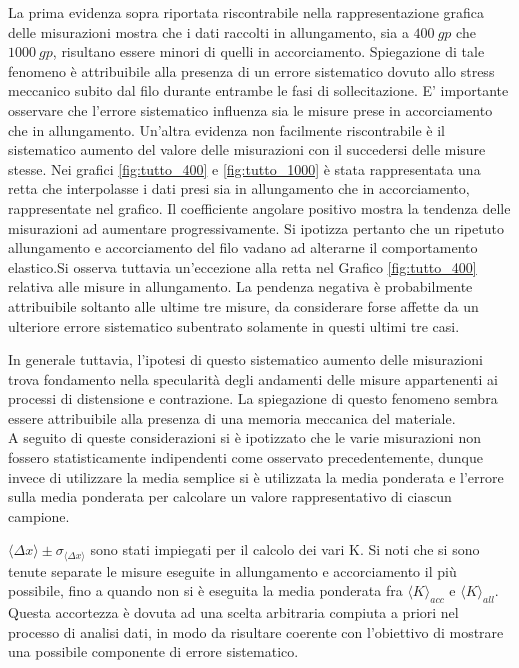 \documentclass[a4paper,11pt,oneside]{article}
\begin{document}
La prima evidenza sopra riportata riscontrabile nella rappresentazione grafica delle misurazioni mostra che i dati raccolti in allungamento, sia a $\SI{400}{gp}$ che $\SI{1000}{gp}$, risultano essere minori di quelli in accorciamento. Spiegazione di tale fenomeno è attribuibile alla presenza di un errore sistematico dovuto allo stress meccanico subito dal filo durante entrambe le fasi di sollecitazione. E' importante osservare che l'errore sistematico influenza sia le misure prese in accorciamento che in allungamento.
Un'altra evidenza non facilmente riscontrabile è il sistematico aumento del valore delle misurazioni con il succedersi delle misure stesse. Nei grafici \ref{fig:tutto_400} e \ref{fig:tutto_1000} è stata rappresentata una retta che interpolasse i dati presi sia in allungamento che in accorciamento, rappresentate nel grafico. Il coefficiente angolare positivo mostra la tendenza delle misurazioni ad aumentare progressivamente. Si ipotizza pertanto che un ripetuto allungamento e accorciamento del filo vadano ad alterarne il comportamento elastico.Si osserva tuttavia un'eccezione alla retta nel Grafico \ref{fig:tutto_400} relativa alle misure in allungamento. La pendenza negativa è probabilmente attribuibile soltanto alle ultime tre misure, da considerare forse affette da un ulteriore errore sistematico subentrato solamente in questi ultimi tre casi.

In generale tuttavia, l'ipotesi di questo sistematico aumento delle misurazioni trova fondamento nella specularità degli andamenti delle misure appartenenti ai processi di distensione e contrazione. La spiegazione di questo fenomeno sembra essere attribuibile alla presenza di una memoria meccanica del materiale.\\

A seguito di queste considerazioni si è ipotizzato che le varie misurazioni non fossero statisticamente indipendenti come osservato precedentemente, dunque invece di utilizzare la media semplice si è utilizzata la media ponderata e l'errore sulla media ponderata per calcolare un valore rappresentativo di ciascun campione.

$\langle \Delta x \rangle \pm \sigma_{\langle \Delta x \rangle}$ sono stati impiegati per il calcolo dei vari K. Si noti che si sono tenute separate le misure eseguite in allungamento e accorciamento il più possibile, fino a quando non si è eseguita la media ponderata  fra ${\langle K \rangle}_{acc}$ e ${\langle K \rangle}_{all}$. Questa accortezza è dovuta ad una scelta arbitraria compiuta a priori nel processo di analisi dati, in modo da risultare coerente con l'obiettivo di mostrare una possibile componente di errore sistematico.\\
\end{document}
